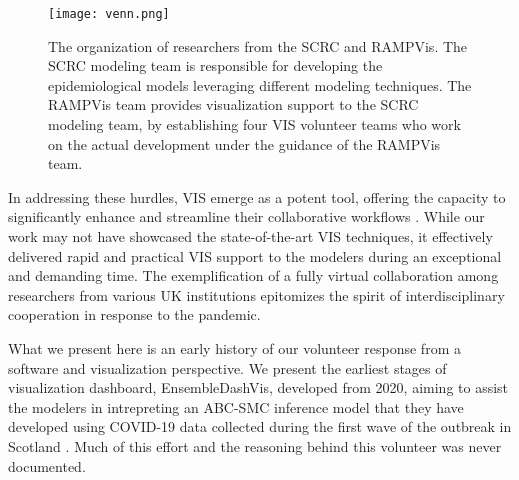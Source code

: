 \begin{figure}[tb!]
    \centering
    \texttt{[image: venn.png]}
    \caption{The organization of researchers from the SCRC and RAMPVis. The SCRC modeling team is responsible for developing the epidemiological models leveraging different modeling techniques. The RAMPVis team provides visualization support to the SCRC modeling team, by establishing four VIS volunteer teams who work on the actual development under the guidance of the RAMPVis team.
    }
    \label{fig:venn}

\end{figure}

In addressing these hurdles, \ac{VIS} emerge as a potent tool, offering the capacity to significantly enhance and streamline their collaborative workflows \cite{swallow2022Challenges}.
While our work may not have showcased the state-of-the-art VIS techniques, it effectively delivered rapid and practical VIS support to the modelers during an exceptional and demanding time.
The exemplification of a fully virtual collaboration among researchers from various UK institutions epitomizes the spirit of interdisciplinary cooperation in response to the pandemic.

What we present here is an early history of our volunteer response from a software and visualization perspective. We present the earliest stages of visualization dashboard, EnsembleDashVis, developed from 2020, aiming to assist the modelers in intrepreting an \ac{ABC-SMC} inference model that they have developed using COVID-19 data collected during the first wave of the outbreak in Scotland \cite{2020Covid19}. Much of this effort and the reasoning behind this volunteer was never documented.
